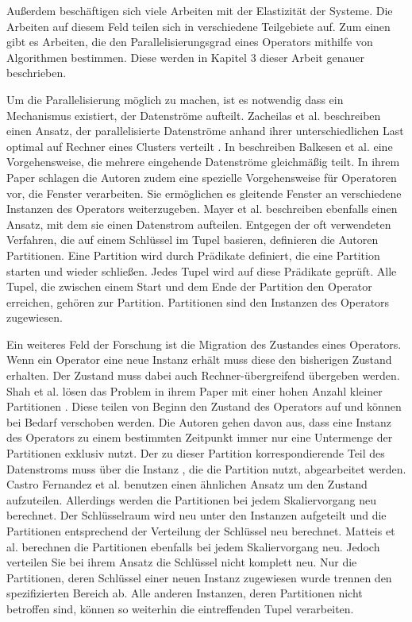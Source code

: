 Außerdem beschäftigen sich viele Arbeiten mit der Elastizität der Systeme.
Die Arbeiten auf diesem Feld teilen sich in verschiedene Teilgebiete auf.
Zum einen gibt es Arbeiten, die den Parallelisierungsgrad eines Operators mithilfe von Algorithmen bestimmen. Diese werden in Kapitel 3 dieser Arbeit genauer beschrieben.

Um die Parallelisierung möglich zu machen, ist es notwendig dass ein Mechanismus existiert, der Datenströme aufteilt.
Zacheilas et al. beschreiben einen Ansatz, der parallelisierte Datenströme anhand ihrer unterschiedlichen Last optimal auf Rechner eines Clusters verteilt \cite{zacheilas_dynamic_2016}.
In \cite{balkesen_adaptive_2013} beschreiben Balkesen et al. eine Vorgehensweise, die mehrere eingehende Datenströme gleichmäßig teilt.
In ihrem Paper schlagen die Autoren zudem eine spezielle Vorgehensweise für Operatoren vor, die Fenster verarbeiten.
Sie ermöglichen es gleitende Fenster an verschiedene Instanzen des Operators weiterzugeben.
Mayer et al. \cite{mayer_predictable_2015} beschreiben ebenfalls einen Ansatz, mit dem sie einen Datenstrom aufteilen.
Entgegen der oft verwendeten Verfahren, die auf einem Schlüssel im Tupel basieren, definieren die Autoren Partitionen.
Eine Partition wird durch Prädikate definiert, die eine Partition starten und wieder schließen.
Jedes Tupel wird auf diese Prädikate geprüft.
Alle Tupel, die zwischen einem Start und dem Ende der Partition den Operator erreichen, gehören zur Partition.
Partitionen sind den Instanzen des Operators zugewiesen.

Ein weiteres Feld der Forschung ist die Migration des Zustandes eines Operators.
Wenn ein Operator eine neue Instanz erhält muss diese den bisherigen Zustand erhalten.
Der Zustand muss dabei auch Rechner-übergreifend übergeben werden.
Shah et al. lösen das Problem in ihrem Paper mit einer hohen Anzahl kleiner Partitionen \cite{shah_flux:_2003}.
Diese teilen von Beginn den Zustand des Operators auf und können bei Bedarf verschoben werden.
Die Autoren gehen davon aus, dass eine Instanz des Operators zu einem bestimmten Zeitpunkt immer nur eine Untermenge der Partitionen exklusiv nutzt.
Der zu dieser Partition korrespondierende Teil des Datenstroms muss über die Instanz , die die Partition nutzt, abgearbeitet werden.
Castro Fernandez et al. \cite{castro_fernandez_integrating_2013} benutzen einen ähnlichen Ansatz um den Zustand aufzuteilen.
Allerdings werden die Partitionen bei jedem Skaliervorgang neu berechnet.
Der Schlüsselraum wird neu unter den Instanzen aufgeteilt und die Partitionen entsprechend der Verteilung der Schlüssel neu berechnet.
Matteis et al. \cite{de_matteis_keep_2016} berechnen die Partitionen ebenfalls bei jedem Skaliervorgang neu.
Jedoch verteilen Sie bei ihrem Ansatz die Schlüssel nicht komplett neu.
Nur die Partitionen, deren Schlüssel einer neuen Instanz zugewiesen wurde trennen den spezifizierten Bereich ab.
Alle anderen Instanzen, deren Partitionen nicht betroffen sind, können so weiterhin die eintreffenden Tupel verarbeiten.

